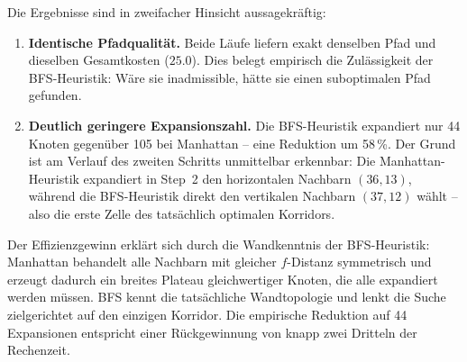 Die Ergebnisse sind in zweifacher Hinsicht aussagekräftig:

\begin{enumerate}
    \item \textbf{Identische Pfadqualität.} Beide Läufe liefern exakt denselben Pfad und dieselben Gesamtkosten (\(25.0\)). Dies belegt empirisch die Zulässigkeit der \acs{BFS}-Heuristik: Wäre sie inadmissible, hätte sie einen suboptimalen Pfad gefunden.
    \item \textbf{Deutlich geringere Expansionszahl.} Die \acs{BFS}-Heuristik expandiert nur 44 Knoten gegenüber 105 bei Manhattan -- eine Reduktion um 58\,\%. Der Grund ist am Verlauf des zweiten Schritts unmittelbar erkennbar: Die Manhattan-Heuristik expandiert in Step~2 den horizontalen Nachbarn \((36, 13)\), während die \acs{BFS}-Heuristik direkt den vertikalen Nachbarn \((37, 12)\) wählt -- also die erste Zelle des tatsächlich optimalen Korridors.
\end{enumerate}

Der Effizienzgewinn erklärt sich durch die Wandkenntnis der \acs{BFS}-Heuristik: Manhattan behandelt alle Nachbarn mit gleicher \(f\)-Distanz symmetrisch und erzeugt dadurch ein breites Plateau gleichwertiger Knoten, die alle expandiert werden müssen. \acs{BFS} kennt die tatsächliche Wandtopologie und lenkt die Suche zielgerichtet auf den einzigen Korridor. Die empirische Reduktion auf 44 Expansionen entspricht einer Rückgewinnung von knapp zwei Dritteln der Rechenzeit.

